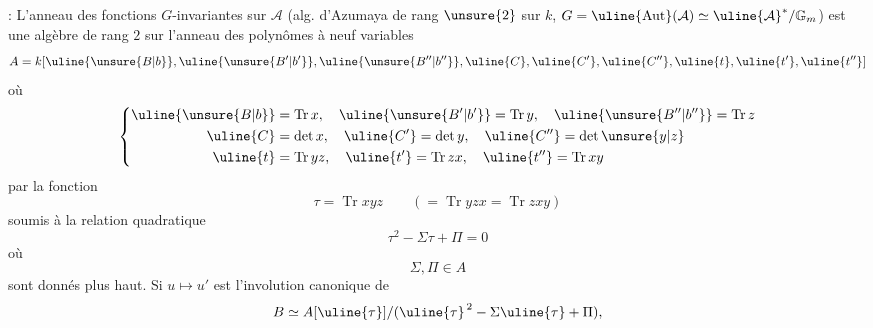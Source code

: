  : L'anneau  des fonctions  $G$-invariantes sur $\mathcal{A}$ (alg. d'Azumaya de rang $\unsure{2}$ sur $k$, $G=\uline{\operatorname{Aut}}(\mathcal{A})\simeq\uline{\mathcal{A}}^*/\mathbb{G}_m$) est une algèbre   de rang $2$ sur l'anneau des polynômes à neuf variables
\[
A=k[\uline{\unsure{B|b}},\uline{\unsure{B'|b'}},\uline{\unsure{B''|b''}},\uline{C},\uline{C'},\uline{C''},\uline{t},\uline{t'},\uline{t''}]
\]
où
\[
\left\{\begin{aligned}
\uline{\unsure{B|b}}&=\operatorname{Tr}x,\quad\uline{\unsure{B'|b'}}=\operatorname{Tr}y,\quad\uline{\unsure{B''|b''}}=\operatorname{Tr}z\\
\uline{C}&=\det x,\quad\uline{C'}=\det y,\quad\uline{C''}=\det\unsure{y|z}\\
\uline{t}&=\operatorname{Tr}yz,\quad\uline{t'}=\operatorname{Tr}zx,\quad\uline{t''}=\operatorname{Tr}xy
\end{aligned}\right.
\]
 par la fonction
\[
\tau=\operatorname{Tr}xyz\qquad(=\operatorname{Tr}yzx=\operatorname{Tr}zxy)
\]
soumis à la relation quadratique
\[
\boxed{\tau^2-\Sigma\tau+\Pi=0}
\]
où 
\[
\Sigma,\Pi\in A
\]
sont donnés plus haut. Si $u\mapsto u'$ est l'involution canonique de
\[
B\simeq A[\uline{\tau}]/(\uline{\tau}^{\,2}-\Sigma\uline{\tau}+\Pi),
\]
